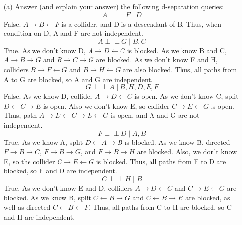 \documentclass[11pt]{article}
\def\ci{\perp\!\!\!\perp}
\begin{document}
\begin{answertext}{18cm}{}
\begin{itemize}

\item[(a)] Answer (and explain your answer) the following d-separation queries:
$$A \ci F \mid D $$
False. $A \rightarrow B \leftarrow F$ is a collider, and D is a descendant of B. Thus, when condition on D, A and F are not independent.
$$A \ci G \mid B,C$$
True. As we don't know D, $A \rightarrow D \leftarrow C$ is blocked. As we know B and C, $A \rightarrow B \rightarrow G$ and $B \rightarrow C \rightarrow G$ are blocked. As we don't know F and H, colliders $B \rightarrow F \leftarrow G$ and $B \rightarrow H \leftarrow G$ are also blocked. Thus, all paths from A to G are blocked, so A and G are independent.
$$G \ci A \mid  B,H,D,E,F$$
False. As we know D, collider $A \rightarrow D \leftarrow C$ is open. As we don't know C, split $D \leftarrow C \rightarrow E$ is open. Also we don't know E, so collider $C \rightarrow E \leftarrow G$ is open. Thus, path $A \rightarrow D \leftarrow C \rightarrow E \leftarrow G$ is open, and A and G are not independent.
$$F \ci D \mid A,B$$
True. As we know A, split $D \leftarrow A \rightarrow B$ is blocked. As we know B, directed $F \rightarrow B \rightarrow C$, $F \rightarrow B \rightarrow G$, and $F \rightarrow B \rightarrow H$ are blocked. Also, we don't know E, so the collider $C \rightarrow E \leftarrow G$ is blocked. Thus, all paths from F to D are blocked, so F and D are independent.
$$C \ci H \mid B$$
True. As we don't know E and D, colliders $A \rightarrow D \leftarrow C$ and $C \rightarrow E \leftarrow G$ are blocked. As we know B, split $C \leftarrow B \rightarrow G$ and $C \leftarrow B \rightarrow H$ are blocked, as well as directed $C \leftarrow B \leftarrow F$. Thus, all paths from C to H are blocked, so C and H are independent.

\end{itemize}
\end{answertext} 
\end{document}
